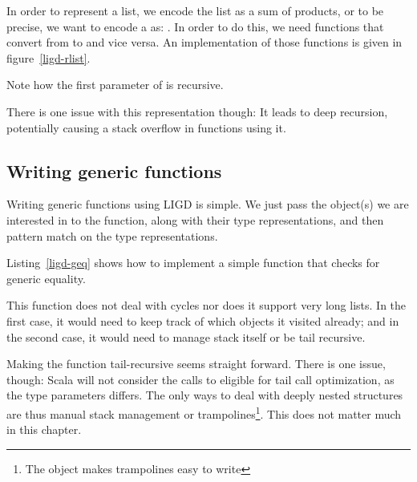 \begin{example}[Lists]
In order to represent a list, we encode the
list as a sum of products, or to be precise, we want to encode a 
as: . In order to do this, we need functions
that convert from  to  and
vice versa. An implementation of those functions is given in figure~\ref{ligd-rlist}.
%



Note how the first parameter of  is recursive.

There is one issue with this representation though: It leads to deep recursion,
potentially causing a stack overflow in functions using it.
\end{example}

\subsection{Writing generic functions}
Writing generic functions using LIGD is simple. We just pass the object(s)
we are interested in to the function, along with their type representations,
and then pattern match on the type representations.

\begin{example}
Listing~\ref{ligd-geq} shows how to implement a simple function that checks for
generic equality.

  

This function does not deal with cycles nor does it support very long lists. In
the first case, it would need to keep track of which objects it visited already;
and in the second case, it would need to manage stack itself or be tail recursive.

Making the function tail-recursive seems straight forward. There is one issue,
though: Scala will not consider the calls to  eligible for tail call
optimization, as the type parameters differs. The only ways to deal with deeply
nested structures are thus manual stack management or trampolines\footnote{The
 object makes trampolines easy to write}. This
does not matter much in this chapter.
\end{example}


